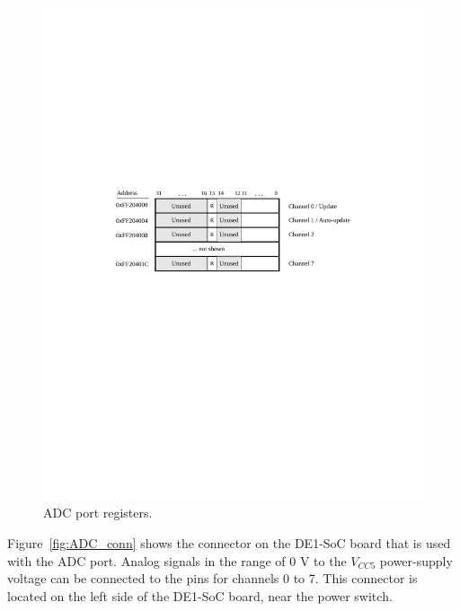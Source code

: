 \documentclass[epsfig,10pt,fullpage]{article}
\begin{document}
\begin{figure}[h!]
   \begin{center}
       \includegraphics{figures/Media_FPGA_ADC.pdf}
   \end{center}
   \caption{ADC port registers.}
	\label{fig:ADC_port}
\end{figure}

\noindent
Figure~\ref{fig:ADC_conn} shows the connector on the DE1-SoC board that is used with the
ADC port. Analog signals in the range of 0 V to the $V_{CC5}$ power-supply voltage can be 
connected to the pins for channels 0 to 7. This connector is located on the left side of
the DE1-SoC board, near the power switch.
\end{document}
